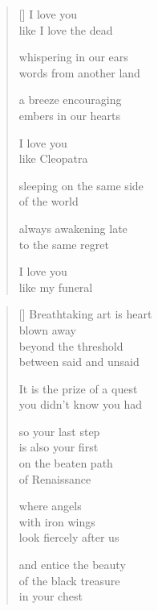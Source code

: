 \documentclass[12pt,a4paper]{article}
\begin{document}

\newpage

\poemtitle{}

\settowidth{\versewidth}{sleeping on the same side}

\bigskip

\begin{verse}[\versewidth]
  I love you \\
  like I love the dead

  whispering in our ears \\
  words from another land

  a breeze encouraging \\
  embers in our hearts

  I love you \\
  like Cleopatra

  sleeping on the same side \\
  of the world

  always awakening late \\
  to the same regret

  I love you \\
  like my funeral
\end{verse}


\newpage

\poemtitle{}

\settowidth{\versewidth}{It is the prize of a quest}

\bigskip

\begin{verse}[\versewidth]
  Breathtaking art is heart \\
  blown away \\
  beyond the threshold \\
  between said and unsaid

  It is the prize of a quest \\
  you didn't know you had

  so your last step \\
  is also your first \\
  on the beaten path \\
  of Renaissance

  where angels \\
  with iron wings \\
  look fiercely after us

  and entice the beauty \\
  of the black treasure \\
  in your chest
\end{verse}
\end{document}
